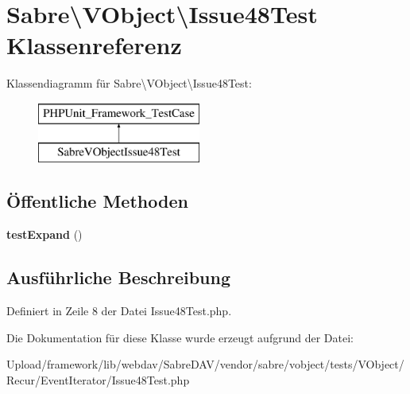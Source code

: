 \hypertarget{class_sabre_1_1_v_object_1_1_issue48_test}{}\section{Sabre\textbackslash{}V\+Object\textbackslash{}Issue48\+Test Klassenreferenz}
\label{class_sabre_1_1_v_object_1_1_issue48_test}
Klassendiagramm für Sabre\textbackslash{}V\+Object\textbackslash{}Issue48\+Test\+:\begin{figure}[H]
\begin{center}
\leavevmode
\includegraphics[height=2.000000cm]{class_sabre_1_1_v_object_1_1_issue48_test}
\end{center}
\end{figure}
\subsection*{Öffentliche Methoden}
\begin{DoxyCompactItemize}
\item 
\mbox{\label{class_sabre_1_1_v_object_1_1_issue48_test_a80a600abd7342adf163fbc3cc4035168}} 
{\bfseries test\+Expand} ()
\end{DoxyCompactItemize}


\subsection{Ausführliche Beschreibung}


Definiert in Zeile 8 der Datei Issue48\+Test.\+php.



Die Dokumentation für diese Klasse wurde erzeugt aufgrund der Datei\+:\begin{DoxyCompactItemize}
\item 
Upload/framework/lib/webdav/\+Sabre\+D\+A\+V/vendor/sabre/vobject/tests/\+V\+Object/\+Recur/\+Event\+Iterator/Issue48\+Test.\+php\end{DoxyCompactItemize}
